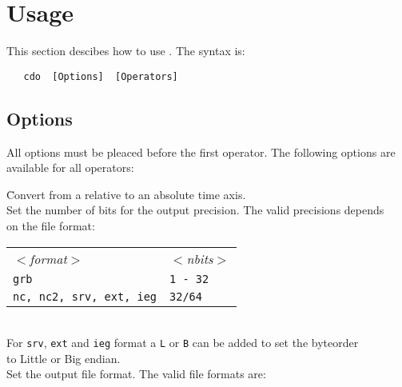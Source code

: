 \section{Usage}

This section descibes how to use {\CDO}.
The syntax is:
\begin{verbatim}
   cdo  [Options]  [Operators]
\end{verbatim}


\subsection{Options}

All options must be pleaced before the first operator.
The following options are available for all operators:

\begin{tabbing}
         \= Convert from a relative to an absolute time axis. \\
         \> Set the number of bits for the output precision. The valid precisions depends \\
         \> on the file format:\\
         \> \parbox[r]{3in}{
              \vspace*{1mm}
              \hspace*{0cm}\begin{tabular}{|l|l|}
              \hline
              \rowcolor[gray]{.9}
                \sl $<$format$>$ & \sl $<$nbits$>$ \\
                {\tt grb}                    & {\tt 1 - 32} \\
                {\tt nc, nc2, srv, ext, ieg} & {\tt 32/64}   \\
              \hline
              \end{tabular}
              \vspace*{1mm}
            } \\
         \> For {\tt srv}, {\tt ext} and {\tt ieg} format a {\tt L} or {\tt B} can be added to set the byteorder \\
         \> to Little or Big endian. \\
         \> Set the output file format. The valid file formats are: \\

\end{tabbing}
